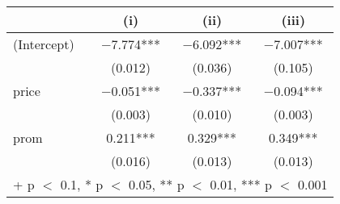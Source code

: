 \begin{table}
\centering
\begin{tabular}[t]{lccc}
\toprule
  & (i) & (ii) & (iii)\\
\midrule
(Intercept) & \num{-7.774}*** & \num{-6.092}*** & \num{-7.007}***\\
 & (\num{0.012}) & (\num{0.036}) & (\num{0.105})\\
price & \num{-0.051}*** & \num{-0.337}*** & \num{-0.094}***\\
 & (\num{0.003}) & (\num{0.010}) & (\num{0.003})\\
prom & \num{0.211}*** & \num{0.329}*** & \num{0.349}***\\
 & (\num{0.016}) & (\num{0.013}) & (\num{0.013})\\
\bottomrule
\multicolumn{4}{l}{\rule{0pt}{1em}+ p $<$ 0.1, * p $<$ 0.05, ** p $<$ 0.01, *** p $<$ 0.001}\\
\end{tabular}
\end{table}
